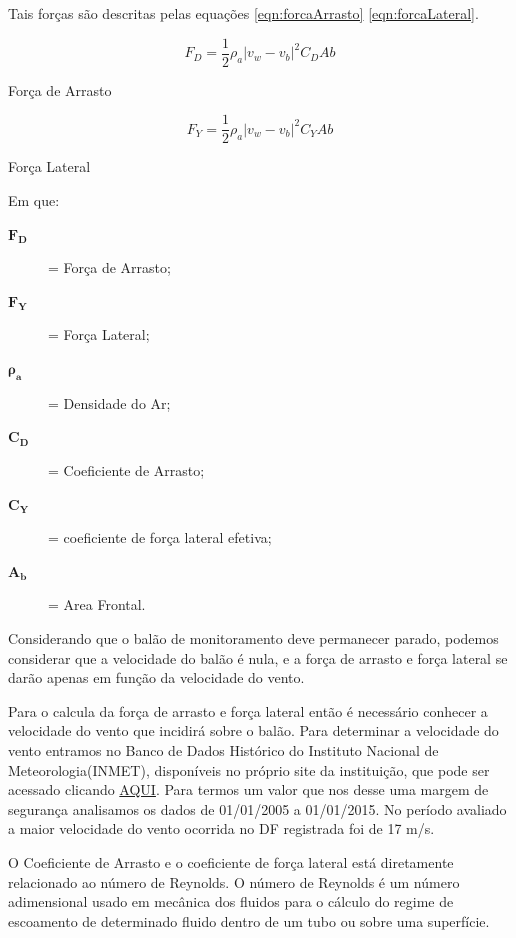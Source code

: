 Tais forças são descritas pelas equações \eqref{eqn:forcaArrasto} \eqref{eqn:forcaLateral}.

	\begin{equacao}[H]
		\begin{equation}
			F_{D} = \frac{1}{2} \rho_{a} \left | v_{w} - v_{b} \right |^{2} C_{D}A{b}
		\end{equation}
		\caption[Força de arrasto]{Força de Arrasto~\cite{yajima}}
		\label{eqn:forcaArrasto}
	\end{equacao}

	\begin{equacao}[H]
		\begin{equation}
			F_{Y} = \frac{1}{2} \rho_{a} \left | v_{w} - v_{b} \right |^{2} C_{Y}A{b}
		\end{equation}
		\caption[Força lateral]{Força Lateral~\cite{yajima}}
		\label{eqn:forcaLateral}
	\end{equacao}

	Em que:
	\begin{description}
		\item[$\boldsymbol{F_{D}}$] = Força de Arrasto;
		\item[$\boldsymbol{F_{Y}}$] = Força Lateral;
		\item[$\boldsymbol{\rho_{a}}$] = Densidade do Ar;
		\item[$\boldsymbol{C_{D}}$] = Coeficiente de Arrasto;
		\item[$\boldsymbol{C_{Y}}$] = coeficiente de força lateral efetiva;
		\item[$\boldsymbol{A_{b}}$] = Area Frontal.
	\end{description}

	Considerando que o balão de monitoramento deve permanecer parado, podemos considerar que a velocidade do balão é nula, e a força de arrasto e força lateral se darão apenas em função da velocidade do vento.

	Para o calcula da força de arrasto e força lateral então é necessário conhecer a velocidade do vento que incidirá sobre o balão. Para determinar a velocidade do vento entramos no Banco de Dados Histórico do Instituto Nacional de Meteorologia(INMET), disponíveis no próprio site da instituição, que pode ser acessado clicando \href{www.inmet.gov.br}{AQUI}. Para termos um valor que nos desse uma margem de segurança analisamos os dados de 01/01/2005 a 01/01/2015. No período avaliado a maior velocidade do vento ocorrida no DF registrada foi de 17 m/s.

	O Coeficiente de Arrasto e o coeficiente de força lateral está diretamente relacionado ao número de Reynolds. O número de Reynolds é um número adimensional usado em mecânica dos fluidos para o cálculo do regime de escoamento de determinado fluido dentro de um tubo ou sobre uma superfície.~\cite{bird}

